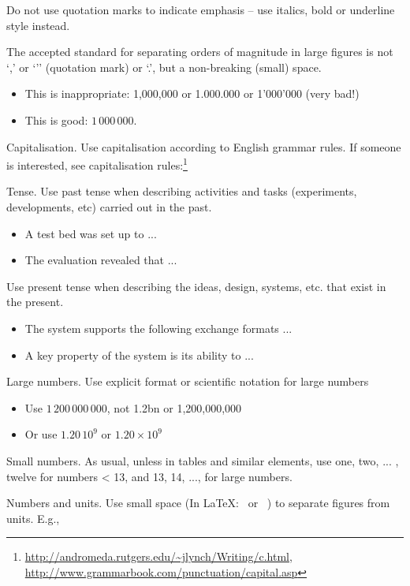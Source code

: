 Do not use quotation marks to indicate emphasis – use italics, bold or underline style instead.

The accepted standard for separating orders of magnitude in large figures is not ‘,’ or ‘’’ (quotation mark) or ‘.’, but a non-breaking (small) space. 

\begin{itemize}
    \item This is inappropriate: 1,000,000 or 1.000.000 or 1’000’000 (very bad!) 
    \item This is good: $1\,000\,000$. 
\end{itemize}

Capitalisation. Use capitalisation according to English grammar rules. If someone is interested, see 
capitalisation rules:\footnote{\url{http://andromeda.rutgers.edu/~jlynch/Writing/c.html}, \url{http://www.grammarbook.com/punctuation/capital.asp}}

Tense. Use past tense when describing activities and tasks (experiments, developments, etc) carried out in the past. 

\begin{itemize}
    \item A test bed was set up to ...
    \item The evaluation revealed that ...
\end{itemize}

Use present tense when describing the ideas, design, systems, etc. that exist in the present. 

\begin{itemize}
    \item The system supports the following exchange formats ...
    \item A key property of the system is its ability to ...
\end{itemize}

Large numbers. Use explicit format or scientific notation for large numbers

\begin{itemize}
    \item Use $1\,200\,000\,000$, not 1.2bn or 1,200,000,000
    \item Or use $1.20\,10^9$ or $1.20 \times 10^9$
\end{itemize}

Small numbers. As usual, unless in tables and similar elements, use {one, two, ... , twelve} for numbers < 13, and {13, 14, ..., } for large numbers.

Numbers and units. Use small space (In \LaTeX: \, or ~) to separate figures from units. E.g.,

